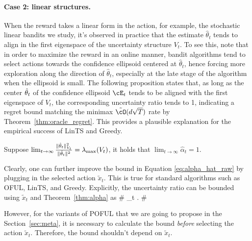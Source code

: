 \paragraph{Case 2:  linear structures.} 
\label{eg:principle_eigen}

When the reward takes a linear form in the action, for example, the stochastic linear bandits we study,  it's observed in practice that the estimate $\hat{\theta}_t$ tends to align in the first eigenspace of the uncertainty structure $V_t$. To see this, note that in order to maximize the reward in an online manner, bandit algorithms tend to select actions towards the confidence ellipsoid centered at  $\hat{\theta}_t$, hence forcing more exploration along the direction of $\hat{\theta}_t$, especially at the late stage of the algorithm when the ellipsoid is small. The following proposition states that, as long as the center $\hat{\theta}_t$ of the confidence ellipsoid $\cE_t$  tends to be aligned with the first eigenspace of $V_t$, the corresponding uncertainty ratio tends to 1, indicating a regret bound matching the minimax $\tilde{\cO}(d\sqrt{T})$ rate by Theorem~\ref{thm:oracle_regret}. This provides a plausible explanation for the empirical success of LinTS and Greedy.
\begin{proposition}\label{prop:align}
	 Suppose $\lim_{t\to \infty}\frac{\|\hat{\theta}_t\|_{V_{t}}^2}{\|\hat{\theta}_t\|^2} =\lambda_{\max}(V_{t}) $, it holds that $\lim_{t\to \infty} \hat{\alpha}_t = 1$.	
\end{proposition}


\begin{remark}

Clearly, one can further improve the bound in Equation \eqref{eq:alpha_hat_raw} by plugging in the selected action $\tilde{x}_t$. This is true for standard algorithms such as OFUL, LinTS, and Greedy. Explicitly, the uncertainty ratio can be bounded using $\tilde{x}_t$ and Theorem~\ref{thm:alpha} as 
\#
\alpha_t \leq {}\leq {}.
\#


However, for the variants of POFUL that we are going to propose in the Section~\ref{sec:meta}, it is necessary to calculate the bound \emph{before} selecting the action $\tilde{x}_t$. Therefore, the bound shouldn't depend on $\tilde{x}_t$. 



\end{remark}



